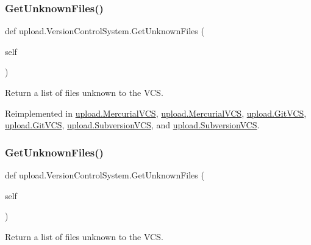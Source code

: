 \subsubsection{\texorpdfstring{GetUnknownFiles()}{GetUnknownFiles()}\hspace{0.1cm}{\footnotesize\ttfamily [1/2]}}
{\footnotesize\ttfamily def upload.\+Version\+Control\+System.\+Get\+Unknown\+Files (\begin{DoxyParamCaption}\item[{}]{self }\end{DoxyParamCaption})}

\begin{DoxyVerb}Return a list of files unknown to the VCS.\end{DoxyVerb}
 

Reimplemented in \mbox{\hyperlink{classupload_1_1_mercurial_v_c_s_a6190899fb86cd09ad84cc5d4b0ebd2f3}{upload.\+Mercurial\+V\+CS}}, \mbox{\hyperlink{classupload_1_1_mercurial_v_c_s_a6190899fb86cd09ad84cc5d4b0ebd2f3}{upload.\+Mercurial\+V\+CS}}, \mbox{\hyperlink{classupload_1_1_git_v_c_s_ae4e8c0e9fa01619c6a5c76d1ab84b995}{upload.\+Git\+V\+CS}}, \mbox{\hyperlink{classupload_1_1_git_v_c_s_ae4e8c0e9fa01619c6a5c76d1ab84b995}{upload.\+Git\+V\+CS}}, \mbox{\hyperlink{classupload_1_1_subversion_v_c_s_a494ba1010992d83cac015bc396ab693a}{upload.\+Subversion\+V\+CS}}, and \mbox{\hyperlink{classupload_1_1_subversion_v_c_s_a494ba1010992d83cac015bc396ab693a}{upload.\+Subversion\+V\+CS}}.

\mbox{\label{classupload_1_1_version_control_system_a56a60e56aa9aff3df4001d2f84cab884}} 
\subsubsection{\texorpdfstring{GetUnknownFiles()}{GetUnknownFiles()}\hspace{0.1cm}{\footnotesize\ttfamily [2/2]}}
{\footnotesize\ttfamily def upload.\+Version\+Control\+System.\+Get\+Unknown\+Files (\begin{DoxyParamCaption}\item[{}]{self }\end{DoxyParamCaption})}

\begin{DoxyVerb}Return a list of files unknown to the VCS.\end{DoxyVerb}
 

